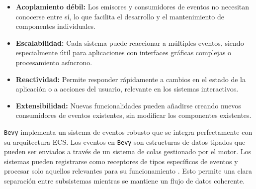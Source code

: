\begin{itemize}
    \item \textbf{Acoplamiento débil:} Los emisores y consumidores de eventos no necesitan conocerse entre sí, lo que facilita el desarrollo y el mantenimiento de componentes individuales.
    
    \item \textbf{Escalabilidad:} Cada sistema puede reaccionar a múltiples eventos, siendo especialmente útil para aplicaciones con interfaces gráficas complejas o procesamiento asíncrono.
    
    \item \textbf{Reactividad:} Permite responder rápidamente a cambios en el estado de la aplicación o a acciones del usuario, relevante en los sistemas interactivos.
    
    \item \textbf{Extensibilidad:} Nuevas funcionalidades pueden añadirse creando nuevos consumidores de eventos existentes, sin modificar los componentes existentes.
\end{itemize}

\texttt{Bevy} implementa un sistema de eventos robusto que se integra perfectamente con su arquitectura \ac{ECS}. Los eventos en \texttt{Bevy} son estructuras de datos tipados que pueden ser enviados a través de un sistema de colas gestionado por el motor. Los sistemas pueden registrarse como receptores de tipos específicos de eventos y procesar solo aquellos relevantes para su funcionamiento \autocite{EventsBevyPrelude,EventsUnofficialBevy}. Esto permite una clara separación entre subsistemas mientras se mantiene un flujo de datos coherente.






